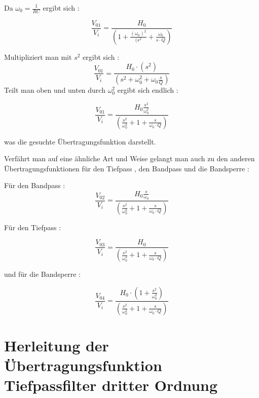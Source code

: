 \documentclass[
  ngerman,
  letterpaper,
  DIV=11]{scrreprt}
\begin{document}
Da \(\omega_{0} = \frac{1}{RC}\) ergibt sich :

\begin{equation}
    \frac{V_{01}}{V_{i}} = \frac{H_{0}}{\left( 1 +  \frac{ (\omega_{0})^2 }{(s^2}  + \frac{\omega_{0}}{s\cdot Q}  \right)  } 
\label{eq:0P11}
\end{equation}

Multipliziert man mit \(s^2\) ergibt sich : \begin{equation}
    \frac{V_{01}}{V_{i}} = \frac{H_{0} \cdot(s^2)}{\left( s^2 +  \omega_{0}^2  + \omega_{0} \frac{s}{Q} \right)  } 
\label{eq:0P12}
\end{equation} Teilt man oben und unten durch \(\omega_{0}^2\) ergibt
sich endlich :

\begin{equation}
    \frac{V_{01}}{V_{i}} = \frac{H_{0} \frac{s^2}{\omega_{0}^2}}{\left( \frac{s^2}{\omega_{0}^2}  +  1  + \frac{s}{ \omega_{0} \cdot Q }  \right)  } 
\label{eq:0P13}
\end{equation}

was die gesuchte Übertragungsfunktion darstellt.

Verfährt man auf eine ähnliche Art und Weise gelangt man auch zu den
anderen Übertragungsfunktionen für den Tiefpass , den Bandpass und die
Bandsperre :

Für den Bandpass : \begin{equation}
    \frac{V_{02}}{V_{i}} = \frac{H_{0} \frac{s}{\omega_{0}}}{\left( \frac{s^2}{\omega_{0}^2}  +  1  + \frac{s}{ \omega_{0} \cdot Q }  \right)  } 
\label{eq:0P14}
\end{equation}

Für den Tiefpass :

\begin{equation}
    \frac{V_{03}}{V_{i}} = \frac{H_{0}}{\left( \frac{s^2}{\omega_{0}^2}  +  1  + \frac{s}{ \omega_{0} \cdot Q }  \right)  } 
\label{eq:0P15}
\end{equation}

und für die Bandsperre :

\begin{equation}
    \frac{V_{04}}{V_{i}} = \frac{H_{0} \cdot(1 + \frac{s^2}{\omega_{0}^2})}{\left( \frac{s^2}{\omega_{0}^2}  +  1  + \frac{s}{ \omega_{0} \cdot Q }  \right)  } 
\label{eq:0P13}
\end{equation}

\section{Herleitung der Übertragungsfunktion Tiefpassfilter dritter
Ordnung}\label{herleitung-der-uxfcbertragungsfunktion-tiefpassfilter-dritter-ordnung}
\end{document}
